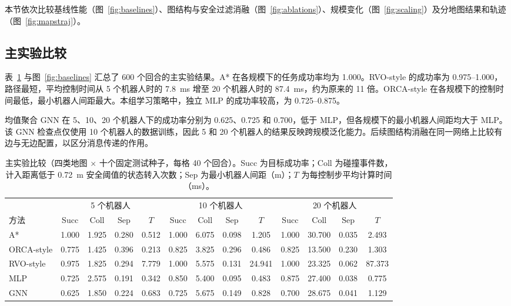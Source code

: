 \documentclass[conference]{IEEEtran}
\begin{document}
本节依次比较基线性能（图~\ref{fig:baselines}）、图结构与安全过滤消融（图~\ref{fig:ablations}）、规模变化（图~\ref{fig:scaling}）及分地图结果和轨迹（图~\ref{fig:mapstraj}）。

\subsection{主实验比较}
表~\ref{tab:main} 与图~\ref{fig:baselines} 汇总了 600 个回合的主实验结果。A* 在各规模下的任务成功率均为 1.000。RVO-style 的成功率为 0.975--1.000，路径最短，平均控制时间从 5 个机器人时的 7.8~ms 增至 20 个机器人时的 87.4~ms，约为原来的 11 倍。ORCA-style 在各规模下的控制时间最低，最小机器人间距最大。本组学习策略中，独立 MLP 的成功率较高，为 0.725--0.875。

均值聚合 GNN 在 5、10、20 个机器人下的成功率分别为 0.625、0.725 和 0.700，低于 MLP，但各规模下的最小机器人间距均大于 MLP。该 GNN 检查点仅使用 10 个机器人的数据训练，因此 5 和 20 个机器人的结果反映跨规模泛化能力。后续图结构消融在同一网络上比较有边与无边配置，以区分消息传递的作用。

\begin{table}[t]
\caption{主实验比较（四类地图 $\times$ 十个固定测试种子，每格 40 个回合）。Succ 为目标成功率；Coll 为碰撞事件数，计入距离低于 0.72~m 安全阈值的状态转入次数；Sep 为最小机器人间距（m）；$T$ 为每控制步平均计算时间（ms）。}
\label{tab:main}
\centering
\footnotesize
\setlength{\tabcolsep}{3pt}
\begin{tabular}{lcccccccccccc}
\toprule
& \multicolumn{4}{c}{5 个机器人} & \multicolumn{4}{c}{10 个机器人} & \multicolumn{4}{c}{20 个机器人}\\
\cmidrule(lr){2-5}\cmidrule(lr){6-9}\cmidrule(lr){10-13}
方法 & Succ & Coll & Sep & $T$ & Succ & Coll & Sep & $T$ & Succ & Coll & Sep & $T$\\
\midrule
A*         & 1.000 & 1.925  & 0.280 & 0.512 & 1.000 & 6.075  & 0.098 & 1.205 & 1.000 & 30.700 & 0.035 & 2.493\\
ORCA-style & 0.775 & 1.425  & 0.396 & 0.213 & 0.825 & 3.825  & 0.296 & 0.486 & 0.825 & 13.500 & 0.230 & 1.303\\
RVO-style  & 0.975 & 1.825  & 0.294 & 7.779 & 1.000 & 5.575  & 0.131 & 24.941 & 1.000 & 23.325 & 0.062 & 87.373\\
MLP        & 0.725 & 2.575  & 0.191 & 0.342 & 0.850 & 5.400  & 0.095 & 0.483 & 0.875 & 27.400 & 0.038 & 0.775\\
GNN        & 0.625 & 1.850  & 0.224 & 0.683 & 0.725 & 5.675  & 0.149 & 0.828 & 0.700 & 28.675 & 0.041 & 1.129\\
\bottomrule
\end{tabular}
\end{table}
\end{document}
